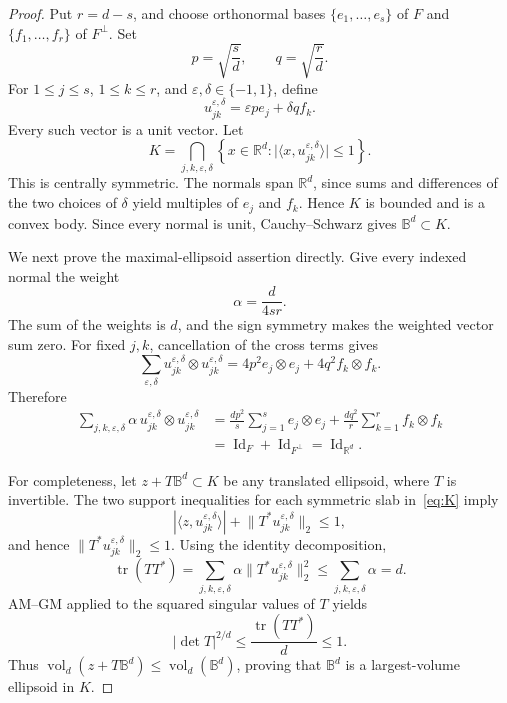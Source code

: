 \documentclass[11pt]{article}
\newcommand{\R}{\mathbb R}
\newcommand{\B}{\mathbb B}
\newcommand{\vol}{\operatorname{vol}}
\newcommand{\Id}{\operatorname{Id}}
\begin{document}
\begin{proof}
Put \(r=d-s\), and choose orthonormal bases
\(\{e_1,\dots,e_s\}\) of \(F\) and
\(\{f_1,\dots,f_r\}\) of \(F^\perp\).  Set
\[
 p=\sqrt{\frac{s}{d}},\qquad q=\sqrt{\frac{r}{d}}.
\]
For \(1\leq j\leq s\), \(1\leq k\leq r\), and
\(\varepsilon,\delta\in\{-1,1\}\), define
\[
 u_{jk}^{\varepsilon,\delta}
 =\varepsilon p e_j+\delta q f_k.
\]
Every such vector is a unit vector.  Let
\begin{equation}\label{eq:K}
 K=\bigcap_{j,k,\varepsilon,\delta}
 \left\{x\in\R^d:
 \bigl|\langle x,u_{jk}^{\varepsilon,\delta}\rangle\bigr|\leq1
 \right\}.
\end{equation}
This is centrally symmetric.  The normals span \(\R^d\), since sums and
differences of the two choices of \(\delta\) yield multiples of \(e_j\)
and \(f_k\).  Hence \(K\) is bounded and is a convex body.  Since every
normal is unit, Cauchy--Schwarz gives \(\B^d\subset K\).

We next prove the maximal-ellipsoid assertion directly.  Give every indexed
normal the weight
\[
 \alpha=\frac{d}{4sr}.
\]
The sum of the weights is \(d\), and the sign symmetry makes the weighted
vector sum zero.  For fixed \(j,k\), cancellation of the cross terms gives
\[
 \sum_{\varepsilon,\delta}
 u_{jk}^{\varepsilon,\delta}\otimes
 u_{jk}^{\varepsilon,\delta}
 =4p^2 e_j\otimes e_j+4q^2 f_k\otimes f_k.
\]
Therefore
\begin{align*}
 \sum_{j,k,\varepsilon,\delta}
 \alpha\,u_{jk}^{\varepsilon,\delta}\otimes
 u_{jk}^{\varepsilon,\delta}
 &=\frac{d p^2}{s}\sum_{j=1}^s e_j\otimes e_j
   +\frac{d q^2}{r}\sum_{k=1}^r f_k\otimes f_k\\
 &=\Id_F+\Id_{F^\perp}=\Id_{\R^d}.
\end{align*}

For completeness, let \(z+T\B^d\subset K\) be any translated ellipsoid,
where \(T\) is invertible.  The two support inequalities for each symmetric
slab in~\eqref{eq:K} imply
\[
 |\langle z,u_{jk}^{\varepsilon,\delta}\rangle|
 +\lVert T^*u_{jk}^{\varepsilon,\delta}\rVert_2\leq1,
\]
and hence \(\lVert T^*u_{jk}^{\varepsilon,\delta}\rVert_2\leq1\).
Using the identity decomposition,
\[
 \operatorname{tr}(TT^*)
 =\sum_{j,k,\varepsilon,\delta}
   \alpha\lVert T^*u_{jk}^{\varepsilon,\delta}\rVert_2^2
 \leq\sum_{j,k,\varepsilon,\delta}\alpha=d.
\]
AM--GM applied to the squared singular values of \(T\) yields
\[
 |\det T|^{2/d}\leq\frac{\operatorname{tr}(TT^*)}{d}\leq1.
\]
Thus \(\vol_d(z+T\B^d)\leq\vol_d(\B^d)\), proving that \(\B^d\) is a
largest-volume ellipsoid in \(K\).


\end{proof}
\end{document}

